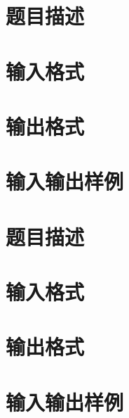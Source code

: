 \documentclass{ctpro}
\begin{document}
\makeproblem
\section*{题目描述}
\section*{输入格式}
\section*{输出格式}
\section*{输入输出样例}

\makeproblem
\section*{题目描述}
\section*{输入格式}
\section*{输出格式}
\section*{输入输出样例}
\end{document}
